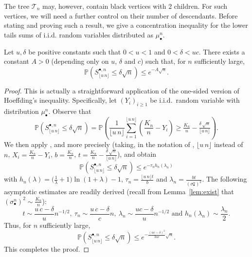 \documentclass[10pt]{amsart}
\theoremstyle{definition}\newtheorem{defi}[theo]{Definition}\newtheorem{rema}[theo]{Remark}\newtheorem{exam}[theo]{Example}\newtheorem{exem}[theo]{Example}\newtheorem{nota}[theo]{Notation}
\def\mubn{\mu_{\bullet}^{n}}
\def\sbn{\sigma_{\bullet}^{n}}
\def\Sbn{S^{\bullet,n}}
\def\Ts{\mathscr{T}}
\renewcommand\Pr[1]{\mathbb{P}\left(#1\right)}
\begin{document}
The tree $\Ts_{n}$ may, however, contain black vertices with $2$ children.
For such vertices, we will need a further control on their number of descendants.
Before stating and proving such a result, we give a concentration inequality for the lower tails sums of i.i.d. random variables distributed as $\mubn$.

\begin{lemma}
  Let $u, \delta$ be positive constants such that $0<u<1$ and $0<\delta<u c$. There exists a constant $A>0$ (depending only on $u$, $\delta$ and $c$)
  such that, for $n$ sufficiently large,
  \[\Pr{\Sbn_{\lfloor u\, n \rfloor} \le \delta \sqrt{n}}
  \le e^{-A\sqrt{n}}.\]
  \label{lem:Concentration}
\end{lemma}
\begin{proof}
This is actually a straightforward application of the one-sided version of  Hoeffding's inequality.
Specifically, let $(Y_{i})_{i \geq 1}$ be i.i.d.~random variable with distribution $\mubn$. Observe that
\[\Pr{\Sbn_{\lfloor u\, n \rfloor} \le \delta \sqrt{n}}= \Pr{ \frac{1}{\lfloor u\, n \rfloor} \sum_{i=1}^{\lfloor u\, n \rfloor} \left(  \frac{K_{n}}{n}-Y_{i} \right)  \geq \tfrac{K_n}{n}-\tfrac{\delta \, \sqrt{n}}{\lfloor u\, n\rfloor}}.\]
We then apply \cite[Theorem 3]{Hoeffding}, and more precisely \cite[Eq.~(2.12)]{Hoeffding} (taking, in the notation of \cite{Hoeffding}, $\lfloor u\, n \rfloor$ instead of $n$, $X_{i}= \tfrac{K_{n}}{n}-Y_{i}$, $b= \tfrac{K_{n}}{n}$, $t=\tfrac{K_n}{n}-\tfrac{\delta \, \sqrt{n}}{\lfloor u\, n\rfloor}$), and obtain
\[\Pr{\Sbn_{\lfloor u\, n \rfloor} \le \delta \sqrt{n}}
  \leq e^{-\tau_{n} h_{n}(\lambda_{n})}\]
  with $h_{n}(\lambda)= \big( \tfrac{1}{\lambda} +1\big)  \ln(1+\lambda)-1$, $\tau_{n}= \tfrac{\lfloor u\, n \rfloor t}{b}$ and $\lambda_{n}= \tfrac{bt}{(\sbn)^{2}}$. The following asymptotic estimates are readily derived
  (recall from Lemma~\ref{lem:exist} that $(\sbn)^{2} \sim \tfrac{K_n}{n}$):
  \[t \sim \frac{u \, c-\delta}{u} n^{-1/2},\ \tau_{n} \sim  \frac{u \, c-\delta}{c} n,\  \lambda_{n} \sim \frac{uc-\delta}{u} n^{-1/2}\text{ and }h_{n}(\lambda_{n}) \sim \frac{\lambda_{n}}{2}.\]
  Thus, for $n$ sufficiently large,
\[\Pr{\Sbn_{\lfloor u\, n \rfloor} \le \delta \sqrt{n}} \leq  e^{- \frac{(uc-\delta)^{2}}{3uc} \sqrt{n}}.\]
This completes the proof.
\end{proof}
\end{document}
